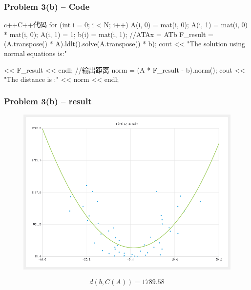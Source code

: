 \begin{frame}[fragile] 
    \frametitle{Problem 3(b) – Code}
    \begin{codeblock}{c++}{C++代码}
        for (int i = 0; i < N; i++) {
            A(i, 0) = mat(i, 0);
            A(i, 1) = mat(i, 0) * mat(i, 0);
            A(i, 1) = 1;
            b(i) = mat(i, 1);
        }
        //ATAx = ATb
        F_result = (A.transpose() * A).ldlt().solve(A.transpose() * b);
        cout << "The solution using normal equations is:\n"

            << F_result << endl;
        //输出距离
        norm = (A * F_result - b).norm();
        cout << "The distance is :\n"
            << norm << endl;
    \end{codeblock}
\end{frame}

\begin{frame}         %
    \frametitle{Problem 3(b) – result}

    \begin{figure}
        \centering
        \includegraphics[height = 0.5\textheight]{img/result3_2.png}
    \end{figure}
        \begin{equation}
        d(b,C(A))=1789.58
    \end{equation}
\end{frame}
